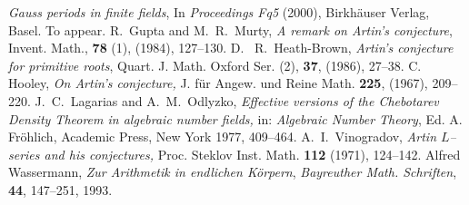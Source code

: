 \documentclass[twoside,final,reqno,noamsfonts]{birkartspecial}
\begin{document}
\begin{thebibliography}{99}
\emph{Gauss periods in finite fields},
In {\em Proceedings {Fq5}} (2000), Birkh\"auser Verlag, Basel.
To appear.
 {R.~Gupta and M.~R.~Murty},
\emph{A remark on {A}rtin's conjecture}, {Invent. Math.}, \textbf{78} (1),
(1984), {127--130}.
 {D.~ R.~Heath-Brown}, \emph{Artin's conjecture for primitive roots}, {Quart. J. Math. Oxford Ser. (2)}, \textbf{37}, (1986), {27--38}.
 C. Hooley, \emph{On Artin's conjecture,} J. f\"ur Angew. und Reine Math.
\textbf{225}, (1967), 209--220.
 J.~C.~Lagarias and A.~M.~Odlyzko,
\emph{Effective versions of the Chebotarev Density Theorem in algebraic number fields,}
in: \emph{Algebraic Number Theory},
Ed. A. Fr\"ohlich, Academic Press, New York  1977, 409--464.
 A.~I.~Vinogradov, \emph{Artin $L$--series and his conjectures,}
Proc. Steklov Inst. Math. \textbf{112} (1971), 124--142.
Alfred Wassermann,
\emph{Zur {Arithmetik} in endlichen {K\"orpern}},
{\em Bayreuther Math. Schriften}, \textbf{44}, 147--251, 1993.
\end{thebibliography}
\end{document}
